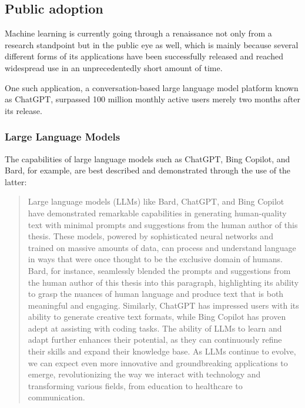 \documentclass[masterthesis]{fer}
\begin{document}
\subsection{Public adoption}
Machine learning is currently going through a renaissance not only from a research standpoint but in the public eye as well, which is mainly because several different forms of its applications have been successfully released and reached widespread use in an unprecedentedly short amount of time.

One such application, a conversation-based large language model platform known as ChatGPT, surpassed 100 million monthly active users merely two months after its release.

\subsubsection{Large Language Models}
The capabilities of large language models such as ChatGPT, Bing Copilot, and Bard, for example, are best described and demonstrated through the use of the latter:

\begin{quote}
Large language models (LLMs) like Bard, ChatGPT,
and Bing Copilot have demonstrated remarkable
capabilities in generating human-quality text with
minimal prompts and suggestions from the human
author of this thesis. These models, powered by
sophisticated neural networks and trained on
massive amounts of data, can process and
understand language in ways that were once thought
to be the exclusive domain of humans. Bard, for
instance, seamlessly blended the prompts and
suggestions from the human author of this thesis
into this paragraph, highlighting its ability to
grasp the nuances of human language and produce
text that is both meaningful and engaging.
Similarly, ChatGPT has impressed users with its
ability to generate creative text formats, while
Bing Copilot has proven adept at assisting with
coding tasks. The ability of LLMs to learn and
adapt further enhances their potential, as they
can continuously refine their skills and expand
their knowledge base. As LLMs continue to evolve,
we can expect even more innovative and
groundbreaking applications to emerge,
revolutionizing the way we interact with
technology and transforming various fields, from
education to healthcare to communication.

\end{quote}
\end{document}
